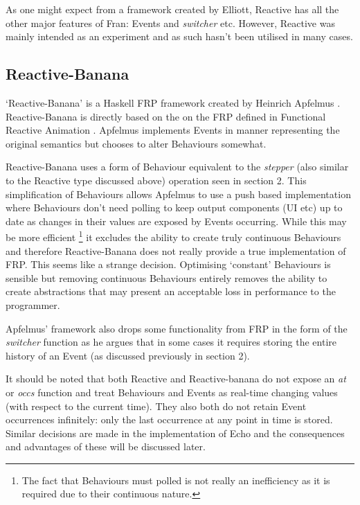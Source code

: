       As one might expect from a framework created by Elliott, Reactive has all the other major features
      of Fran: Events and \emph{switcher} etc. However, Reactive was mainly intended as an experiment
      and as such hasn't been utilised in many cases.
  
    \subsection{Reactive-Banana}
      `Reactive-Banana' is a Haskell FRP framework created by Heinrich Apfelmus \cite{Apfelmus}. Reactive-Banana
      is directly based on the on the FRP defined in Functional Reactive Animation \cite{Elliott1997}. Apfelmus
      implements Events in manner representing the original semantics but chooses to alter
      Behaviours somewhat. 
      
      Reactive-Banana uses a form of Behaviour equivalent to the \emph{stepper}
      (also similar to the Reactive type discussed above) operation seen in section 2. This simplification of Behaviours 
      allows 
      Apfelmus to use a push
      based implementation where Behaviours don't need polling to keep output components (UI etc) up to date as changes in 
      their values are exposed
      by Events occurring. While this may be more efficient \footnote{The fact that Behaviours must polled is not really an 
      inefficiency as it is required due to their continuous nature. } it excludes the ability to create truly 
      continuous Behaviours and therefore Reactive-Banana does not really provide a true implementation
      of FRP. This seems like a strange decision. Optimising `constant' Behaviours is sensible
      but removing continuous Behaviours entirely removes the ability to create abstractions that may present
      an acceptable loss in performance to the programmer.
      
      Apfelmus' framework also drops some functionality from FRP in the form of the \emph{switcher} function as
      he argues that in some cases it requires storing the entire history of an Event \cite{Apfelmus2011} (as discussed previously
      in section 2).
      
    It should be noted that both Reactive and Reactive-banana do not expose an \emph{at} or \emph{occs} function
    and treat Behaviours and Events as real-time changing values (with respect to the current time). They also both do not 
    retain Event 
    occurrences infinitely: only the last occurrence at any point in time is stored. Similar decisions are made in the 
    implementation of Echo and the consequences and advantages of these will be discussed later.

